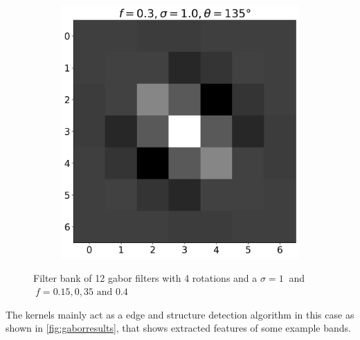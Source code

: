\documentclass[12pt,a4paper, english,twoside]{article}
\begin{document}
\begin{figure}[!htbp]
\begin{subfigure}[b]{0.3\textwidth}
        \end{subfigure}
        \begin{subfigure}[b]{0.3\textwidth}
          \includegraphics[width=\textwidth]{img/K11.png}
        \end{subfigure}
        \caption{Filter bank of 12 gabor filters with 4 rotations and a $\sigma=1\ $ and $\ f = 0.15, 0,35 \text{ and } 0.4$\label{fig:gaborbank}}%
      \end{figure}
      \noindent
      The kernels mainly act as a edge and structure detection algorithm in this case as shown in \cref{fig:gaborresults}, that shows extracted features of some example bands.
\end{document}
